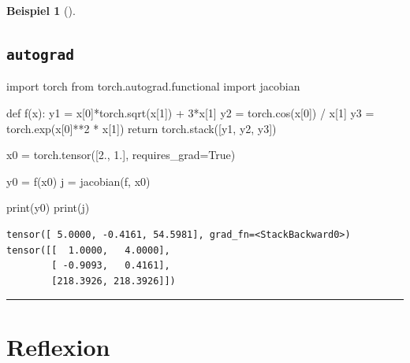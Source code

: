 \documentclass[
  a4paper,
  DIV=11]{scrreprt}
\newenvironment{Shaded}{\begin{snugshade}}{\end{snugshade}}
\newcommand{\BuiltInTok}[1]{\textcolor[rgb]{0.00,0.23,0.31}{#1}}
\newcommand{\ControlFlowTok}[1]{\textcolor[rgb]{0.00,0.23,0.31}{#1}}
\newcommand{\DecValTok}[1]{\textcolor[rgb]{0.68,0.00,0.00}{#1}}
\newcommand{\FloatTok}[1]{\textcolor[rgb]{0.68,0.00,0.00}{#1}}
\newcommand{\ImportTok}[1]{\textcolor[rgb]{0.00,0.46,0.62}{#1}}
\newcommand{\KeywordTok}[1]{\textcolor[rgb]{0.00,0.23,0.31}{#1}}
\newcommand{\NormalTok}[1]{\textcolor[rgb]{0.00,0.23,0.31}{#1}}
\newcommand{\OperatorTok}[1]{\textcolor[rgb]{0.37,0.37,0.37}{#1}}
\newcommand{\VariableTok}[1]{\textcolor[rgb]{0.07,0.07,0.07}{#1}}
\theoremstyle{definition}
\theoremstyle{definition}
\newtheorem{example}{Beispiel}[chapter]
\theoremstyle{remark}
\begin{document}
\begin{example}[]
\section{\texorpdfstring{\texttt{autograd}}{autograd}}

\begin{Shaded}
\begin{Highlighting}[]
\ImportTok{import}\NormalTok{ torch}
\ImportTok{from}\NormalTok{ torch.autograd.functional }\ImportTok{import}\NormalTok{ jacobian}

\KeywordTok{def}\NormalTok{ f(x):}
\NormalTok{    y1 }\OperatorTok{=}\NormalTok{ x[}\DecValTok{0}\NormalTok{]}\OperatorTok{*}\NormalTok{torch.sqrt(x[}\DecValTok{1}\NormalTok{]) }\OperatorTok{+} \DecValTok{3}\OperatorTok{*}\NormalTok{x[}\DecValTok{1}\NormalTok{]}
\NormalTok{    y2 }\OperatorTok{=}\NormalTok{ torch.cos(x[}\DecValTok{0}\NormalTok{]) }\OperatorTok{/}\NormalTok{ x[}\DecValTok{1}\NormalTok{]}
\NormalTok{    y3 }\OperatorTok{=}\NormalTok{ torch.exp(x[}\DecValTok{0}\NormalTok{]}\OperatorTok{**}\DecValTok{2} \OperatorTok{*}\NormalTok{ x[}\DecValTok{1}\NormalTok{])}
    \ControlFlowTok{return}\NormalTok{ torch.stack([y1, y2, y3])}

\NormalTok{x0 }\OperatorTok{=}\NormalTok{ torch.tensor([}\FloatTok{2.}\NormalTok{, }\FloatTok{1.}\NormalTok{], requires\_grad}\OperatorTok{=}\VariableTok{True}\NormalTok{)}

\NormalTok{y0 }\OperatorTok{=}\NormalTok{ f(x0)}
\NormalTok{j }\OperatorTok{=}\NormalTok{ jacobian(f, x0)}

\BuiltInTok{print}\NormalTok{(y0)}
\BuiltInTok{print}\NormalTok{(j)}
\end{Highlighting}
\end{Shaded}

\begin{verbatim}
tensor([ 5.0000, -0.4161, 54.5981], grad_fn=<StackBackward0>)
tensor([[  1.0000,   4.0000],
        [ -0.9093,   0.4161],
        [218.3926, 218.3926]])
\end{verbatim}

\end{example}

\begin{center}\rule{0.5\linewidth}{0.5pt}\end{center}


\hypertarget{sec-reflexion}{%
\chapter{Reflexion}\label{sec-reflexion}}
\end{document}
